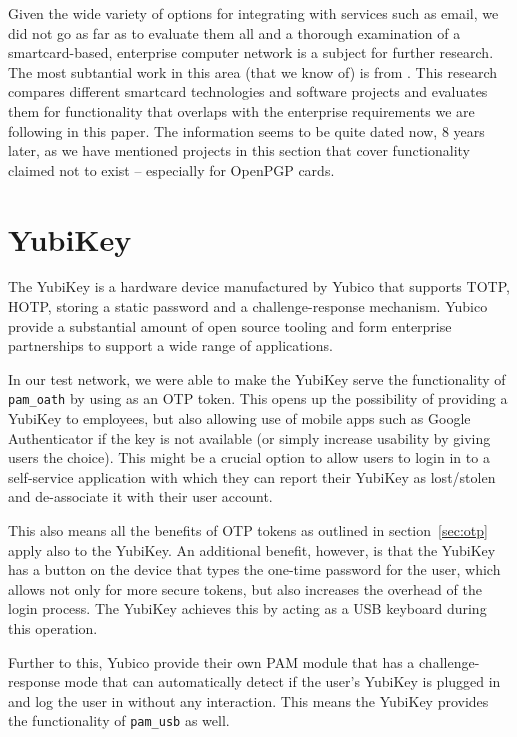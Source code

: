 \documentclass{report}
\begin{document}
Given the wide variety of
options for integrating with services such as email, we did not go as far
as to evaluate them all and a thorough examination of a smartcard-based,
enterprise computer network is a subject for further research. The most
subtantial work in this area (that we know of) is from \cite{grossesecuring}.
This research compares different smartcard technologies and software projects
and evaluates them for functionality that overlaps with the enterprise
requirements we are following in this paper. The information seems to be
quite dated now, 8 years later, as we have mentioned projects in this
section that cover functionality claimed not to exist -- especially for OpenPGP
cards.

\section{YubiKey}

The YubiKey \parencite{merkel2009yubikey} is a hardware device
manufactured by Yubico that supports TOTP, HOTP, storing a static password and
a challenge-response mechanism. Yubico provide a substantial amount of
open source tooling and form enterprise partnerships to support a wide
range of applications.

In our test network, we were able to make the YubiKey serve the functionality
of \texttt{pam\_oath} by using as an OTP token. This opens up the possibility
of providing a YubiKey to employees, but also allowing use of mobile apps
such as Google Authenticator if the key is not available (or simply increase
usability by giving users the choice). This might be a crucial option to
allow users to login in to a self-service application with which they can
report their YubiKey as lost/stolen and de-associate it with their user
account.

This also means all the benefits of OTP tokens as outlined in
section~\ref{sec:otp} apply also to the YubiKey. An additional benefit,
however, is that the YubiKey has a button on the device that types the
one-time password for the user, which allows not only for more secure tokens,
but also increases the overhead of the login process. The YubiKey achieves
this by acting as a USB keyboard during this operation.

Further to this, Yubico provide their own PAM module that has a challenge-response
mode that can automatically detect if the user's YubiKey is plugged in
and log the user in without any interaction. This means the YubiKey provides
the functionality of \texttt{pam\_usb} as well.
\end{document}
